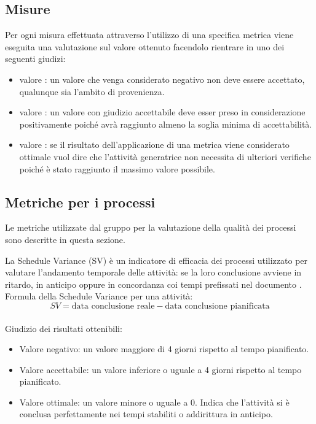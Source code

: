 \documentclass[a4paper, titlepage]{article}
\begin{document}
\subsection{Misure}
Per ogni misura effettuata attraverso l'utilizzo di una specifica metrica viene eseguita una valutazione sul valore ottenuto facendolo rientrare in uno dei seguenti giudizi:
\begin{itemize}
	\item valore : un valore che venga considerato negativo non deve essere accettato, qualunque sia l'ambito di provenienza.
	\item valore : un valore con giudizio accettabile deve esser preso in considerazione positivamente poiché avrà raggiunto almeno la soglia minima di accettabilità.
	\item valore : se il risultato dell'applicazione di una metrica viene considerato ottimale vuol dire che l'attività generatrice non necessita di ulteriori verifiche poiché è stato raggiunto il massimo valore possibile.
\end{itemize} 

\subsection{Metriche per i processi}
Le metriche utilizzate dal gruppo per la valutazione della qualità dei processi sono descritte in questa sezione.

\label{par:SV}
La Schedule Variance (SV) è un indicatore di efficacia dei processi utilizzato per valutare l'andamento temporale delle attività: se la loro conclusione avviene in ritardo, in anticipo oppure in concordanza coi tempi prefissati nel documento .
\newline Formula della Schedule Variance per una attività:
\begin{displaymath}
SV= \mbox{data conclusione reale} - \mbox{data conclusione pianificata}
\end{displaymath}
\\Giudizio dei risultati ottenibili:
\begin{itemize}
\item Valore negativo: un valore maggiore di 4 giorni rispetto al tempo pianificato.
\item Valore accettabile: un valore inferiore o uguale a 4 giorni rispetto al tempo pianificato.
\item Valore ottimale: un valore minore o uguale a 0. Indica che l'attività si è conclusa perfettamente nei tempi stabiliti o addirittura in anticipo. 
\end{itemize}
\end{document}
